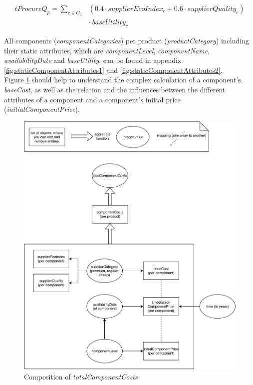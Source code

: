 \begin{equation}
\label{totalProcurementQuality}
\begin{aligned}
    tProcureQ_{p}= \sum_{c \in C_p} & (0.4 \cdot supplierEcoIndex_{c} + 0.6 \cdot supplierQuality_{c})\\
    & \cdot ~baseUtility_{c}
    \end{aligned}
\end{equation}

All components (\textit{componentCategories}) per product (\textit{productCategory}) including their static attributes, which are \textit{componentLevel}, \textit{componentName}, \textit{availabilityDate} and \textit{baseUtility}, can be found in appendix \ref{fig:staticComponentAttributes1} and \ref{fig:staticComponentAttributes2}.\\
Figure \ref{img:totalComponentCosts} should help to understand the complex calculation of a component's \textit{baseCost}, as well as the relation and the influences between the different attributes of a component and a component’s initial price (\textit{initialComponentPrice}).

\begin{figure} [H]
	\centering
	\includegraphics[width=11.5cm]{images/totalComponentCosts.pdf}
	\caption{Composition of \textit{totalComponentCosts}}
	\label{img:totalComponentCosts}
\end{figure}

